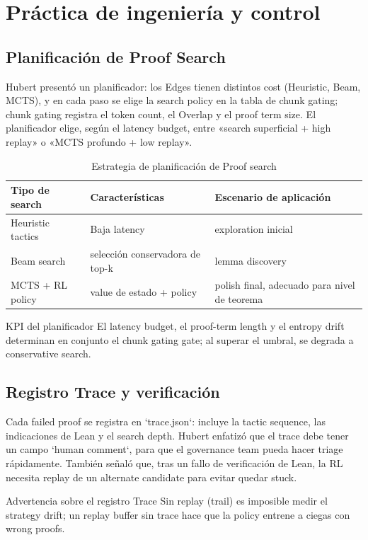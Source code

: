 \documentclass[a4paper]{article}
\begin{document}
\section{Práctica de ingeniería y control}

\subsection{Planificación de Proof Search}
Hubert presentó un planificador: los Edges tienen distintos cost (Heuristic, Beam, MCTS), y en cada paso se elige la search policy en la tabla de chunk gating; chunk gating registra el token count, el Overlap y el proof term size. El planificador elige, según el latency budget, entre «search superficial + high replay» o «MCTS profundo + low replay».
\begin{table}[H]
\centering
\begin{tabular}{p{4cm}p{4cm}p{4cm}}
\toprule
Tipo de search & Características & Escenario de aplicación \\
\midrule
Heuristic tactics & Baja latency & exploration inicial \\
Beam search & selección conservadora de top-k & lemma discovery \\
MCTS + RL policy & value de estado + policy & polish final, adecuado para nivel de teorema \\
\bottomrule
\end{tabular}
\caption{Estrategia de planificación de Proof search}
\end{table}
\begin{importantbox}{KPI del planificador}
El latency budget, el proof-term length y el entropy drift determinan en conjunto el chunk gating gate; al superar el umbral, se degrada a conservative search.
\end{importantbox}

\subsection{Registro Trace y verificación}
Cada failed proof se registra en `trace.json`: incluye la tactic sequence, las indicaciones de Lean y el search depth. Hubert enfatizó que el trace debe tener un campo `human comment`, para que el governance team pueda hacer triage rápidamente. También señaló que, tras un fallo de verificación de Lean, la RL necesita replay de un alternate candidate para evitar quedar stuck.
\begin{warningbox}{Advertencia sobre el registro Trace}
Sin replay (trail) es imposible medir el strategy drift; un replay buffer sin trace hace que la policy entrene a ciegas con wrong proofs.
\end{warningbox}
\end{document}
